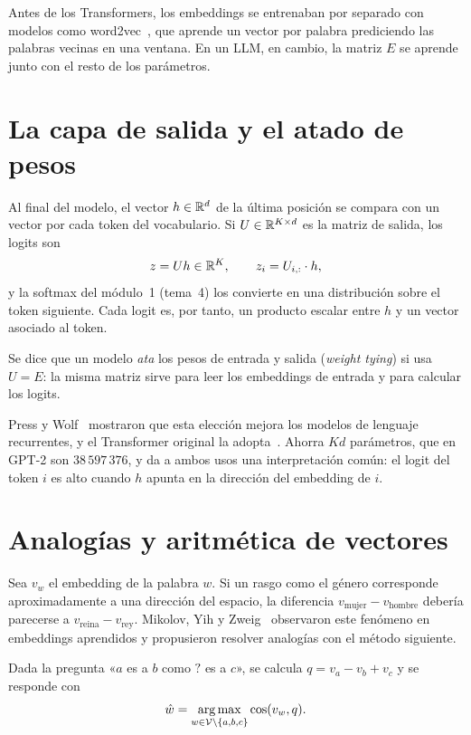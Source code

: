 Antes de los Transformers, los embeddings se entrenaban por separado con modelos como word2vec~\cite{mikolov-a}, que aprende un vector por palabra prediciendo las palabras vecinas en una ventana. En un LLM, en cambio, la matriz $E$ se aprende junto con el resto de los parámetros.

\section{La capa de salida y el atado de pesos}

Al final del modelo, el vector $h\in\mathbb{R}^{d}$ de la última posición se compara con un vector por cada token del vocabulario. Si $U\in\mathbb{R}^{K\times d}$ es la matriz de salida, los logits son
\[
z=Uh\in\mathbb{R}^{K},\qquad z_i=U_{i,:}\cdot h,
\]
y la softmax del módulo~1 (tema~4) los convierte en una distribución sobre el token siguiente. Cada logit es, por tanto, un producto escalar entre $h$ y un vector asociado al token.

\begin{definicion}
Se dice que un modelo \emph{ata} los pesos de entrada y salida (\emph{weight tying}) si usa $U=E$: la misma matriz sirve para leer los embeddings de entrada y para calcular los logits.
\end{definicion}

Press y Wolf~\cite{press} mostraron que esta elección mejora los modelos de lenguaje recurrentes, y el Transformer original la adopta~\cite[§3.4]{vaswani}. Ahorra $Kd$ parámetros, que en GPT-2 son $38\,597\,376$, y da a ambos usos una interpretación común: el logit del token $i$ es alto cuando $h$ apunta en la dirección del embedding de $i$.

\section{Analogías y aritmética de vectores}

Sea $v_w$ el embedding de la palabra $w$. Si un rasgo como el género corresponde aproximadamente a una dirección del espacio, la diferencia $v_{\text{mujer}}-v_{\text{hombre}}$ debería parecerse a $v_{\text{reina}}-v_{\text{rey}}$. Mikolov, Yih y Zweig~\cite{mikolov-b} observaron este fenómeno en embeddings aprendidos y propusieron resolver analogías con el método siguiente.

\begin{definicion}\label{def:analogia}
Dada la pregunta «$a$ es a $b$ como $?$ es a $c$», se calcula $q=v_a-v_b+v_c$ y se responde con
\[
\hat w=\operatorname*{arg\,max}_{w\in\mathcal{V}\setminus\{a,b,c\}}\cos(v_w,q).
\]
\end{definicion}

